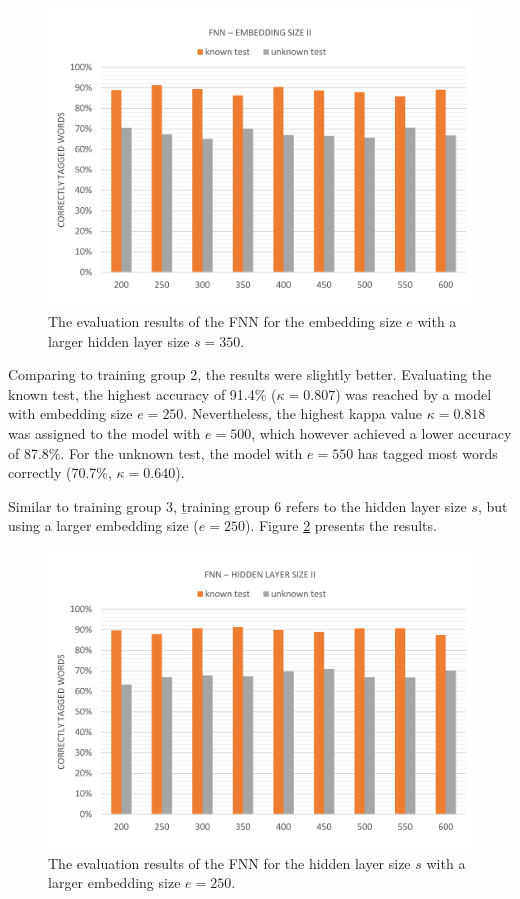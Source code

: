 \begin{figure}[H]
	\hspace{-5mm}\includegraphics[width=1.07\textwidth]{images/evaluation_fnn_e2}
	\caption[FNN Evaluation: Embedding Size II]{The evaluation results of the FNN for the embedding size $e$ with a larger hidden layer size $s=350$.}
	\label{f.evaluation.fnn.e2}
\end{figure}

Comparing to training group 2, the results were slightly better. Evaluating the known test, the highest accuracy of 91.4\% ($\kappa=0.807$) was reached by a model with embedding size $e=250$. Nevertheless, the highest kappa value $\kappa=0.818$ was assigned to the model with $e=500$, which however achieved a lower accuracy of 87.8\%. For the unknown test, the model with $e=550$ has tagged most words correctly (70.7\%, $\kappa=0.640$).

Similar to training group 3, \b{training group 6} refers to the hidden layer size $s$, but using a larger embedding size ($e=250$). Figure {\ref{f.evaluation.fnn.s2}} presents the results.

\begin{figure}[H]
	\hspace{-5mm}\includegraphics[width=1.07\textwidth]{images/evaluation_fnn_s2}
	\caption[FNN Evaluation: Hidden Layer Size II]{The evaluation results of the FNN for the hidden layer size $s$ with a larger embedding size $e=250$.}
	\label{f.evaluation.fnn.s2}
\end{figure}

